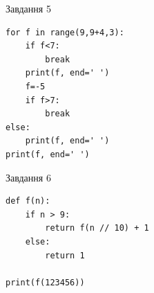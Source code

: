 \documentclass[12pt, ukrainian]{article}
\begin{document}
{\vspace{15mm}
\begin{minipage}[t]{9.7cm}                
{\begin{center}Завдання {5}\end{center}}
\begin{verbatim}
for f in range(9,9+4,3):
    if f<7:
        break
    print(f, end=' ')
    f=-5
    if f>7:
        break
else:
    print(f, end=' ')
print(f, end=' ')
\end{verbatim}     
\end{minipage}
\vline \hspace{8mm}
\begin{minipage}[t]{8.0cm}                
{\begin{center}Завдання {6}\end{center}}
\begin{verbatim}
def f(n):
    if n > 9:
        return f(n // 10) + 1
    else:
        return 1

print(f(123456))
\end{verbatim}     
\end{minipage}

}
\newpage
\end{document}

